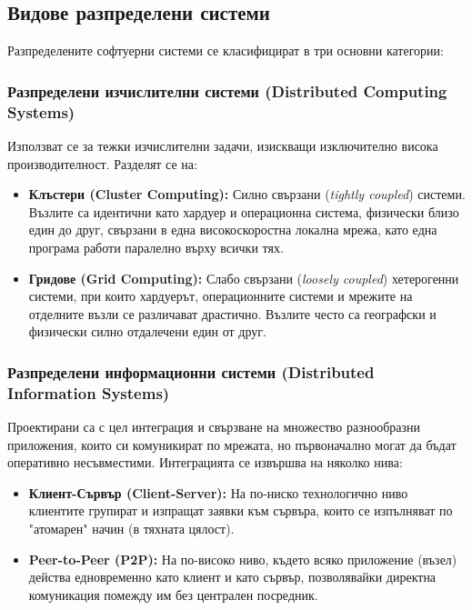 \documentclass{scrartcl}
\begin{document}
\begin{FlushLeft}
\subsection{Видове разпределени системи}
Разпределените софтуерни системи се класифицират в три основни категории:

\subsubsection{Разпределени изчислителни системи (Distributed Computing Systems)}
Използват се за тежки изчислителни задачи, изискващи изключително висока производителност. Разделят се на:
\begin{itemize}
    \item \textbf{Клъстери (Cluster Computing):} Силно свързани (\textit{tightly coupled}) системи. Възлите са идентични като хардуер и операционна система, физически близо един до друг, свързани в една високоскоростна локална мрежа, като една програма работи паралелно върху всички тях.
    \item \textbf{Гридове (Grid Computing):} Слабо свързани (\textit{loosely coupled}) хетерогенни системи, при които хардуерът, операционните системи и мрежите на отделните възли се различават драстично. Възлите често са географски и физически силно отдалечени един от друг.
\end{itemize}

\subsubsection{Разпределени информационни системи (Distributed Information Systems)}
Проектирани са с цел интеграция и свързване на множество разнообразни приложения, които си комуникират по мрежата, но първоначално могат да бъдат оперативно несъвместими. Интеграцията се извършва на няколко нива:
\begin{itemize}
    \item \textbf{Клиент-Сървър (Client-Server):} На по-ниско технологично ниво клиентите групират и изпращат заявки към сървъра, които се изпълняват по "атомарен" начин (в тяхната цялост).
    \item \textbf{Peer-to-Peer (P2P):} На по-високо ниво, където всяко приложение (възел) действа едновременно като клиент и като сървър, позволявайки директна комуникация помежду им без централен посредник.
\end{itemize}


\end{FlushLeft}
\end{document}
